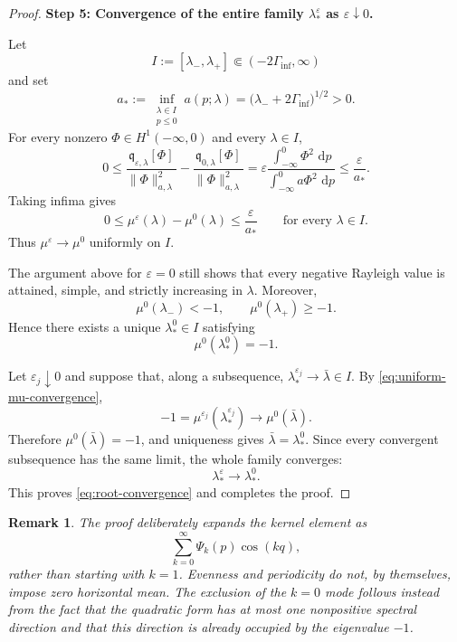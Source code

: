 \documentclass[11pt,reqno]{amsart}
\numberwithin{equation}{section}
\newtheorem{remark}[theorem]{Remark}
\newcommand{\dd}{\,\mathrm{d}}
\theoremstyle{definition}
\theoremstyle{remark}
\begin{document}
\begin{proof}
\medskip
\noindent
\textbf{Step 5: Convergence of the entire family
$\lambda_*^\varepsilon$ as $\varepsilon\downarrow0$.}

Let
\[
I:=[\lambda_-,\lambda_+]
\Subset(-2\Gamma_{\inf},\infty)
\]
and set
\[
a_*:=\inf_{\substack{\lambda\in I\\p\leq0}}
a(p;\lambda)
=
\bigl(\lambda_-+2\Gamma_{\inf}\bigr)^{1/2}>0.
\]
For every nonzero $\Phi\in H^1(-\infty,0)$ and every $\lambda\in I$,
\[
0
\leq
\frac{\mathfrak q_{\varepsilon,\lambda}[\Phi]}
{\|\Phi\|_{a,\lambda}^2}
-
\frac{\mathfrak q_{0,\lambda}[\Phi]}
{\|\Phi\|_{a,\lambda}^2}
=
\varepsilon
\frac{\displaystyle\int_{-\infty}^{0}\Phi^2\,\dd p}
{\displaystyle\int_{-\infty}^{0}a\Phi^2\,\dd p}
\leq
\frac{\varepsilon}{a_*}.
\]
Taking infima gives
\begin{equation}
\label{eq:uniform-mu-convergence}
0
\leq
\mu^\varepsilon(\lambda)-\mu^0(\lambda)
\leq
\frac{\varepsilon}{a_*}
\qquad
\text{for every }\lambda\in I.
\end{equation}
Thus $\mu^\varepsilon\to\mu^0$ uniformly on $I$.

The argument above for $\varepsilon=0$ still shows that every negative
Rayleigh value is attained, simple, and strictly increasing in
$\lambda$.  Moreover,
\[
\mu^0(\lambda_-)<-1,
\qquad
\mu^0(\lambda_+)\geq-1.
\]
Hence there exists a unique
$\lambda_*^0\in I$ satisfying
\[
\mu^0(\lambda_*^0)=-1.
\]

Let $\varepsilon_j\downarrow0$ and suppose that, along a subsequence,
$\lambda_*^{\varepsilon_j}\to\bar\lambda\in I$.  By
\eqref{eq:uniform-mu-convergence},
\[
-1
=
\mu^{\varepsilon_j}(\lambda_*^{\varepsilon_j})
\longrightarrow
\mu^0(\bar\lambda).
\]
Therefore $\mu^0(\bar\lambda)=-1$, and uniqueness gives
$\bar\lambda=\lambda_*^0$.  Since every convergent subsequence has
the same limit, the whole family converges:
\[
\lambda_*^\varepsilon\longrightarrow\lambda_*^0.
\]
This proves \eqref{eq:root-convergence} and completes the proof.
\end{proof}

\begin{remark}
The proof deliberately expands the kernel element as
\[
\sum_{k=0}^{\infty}\Psi_k(p)\cos(kq),
\]
rather than starting with $k=1$.  Evenness and periodicity do not, by
themselves, impose zero horizontal mean.  The exclusion of the
$k=0$ mode follows instead from the fact that the quadratic form has
at most one nonpositive spectral direction and that this direction
is already occupied by the eigenvalue $-1$.
\end{remark}
\end{document}

